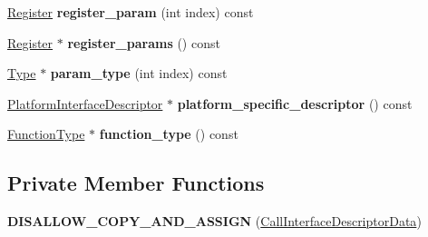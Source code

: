 \begin{DoxyCompactItemize}
\item 
\hyperlink{structv8_1_1internal_1_1_register}{Register} {\bfseries register\+\_\+param} (int index) const \hypertarget{classv8_1_1internal_1_1_call_interface_descriptor_data_af0125d09a09d2b5583cb2a2c18434a3d}{}\label{classv8_1_1internal_1_1_call_interface_descriptor_data_af0125d09a09d2b5583cb2a2c18434a3d}

\item 
\hyperlink{structv8_1_1internal_1_1_register}{Register} $\ast$ {\bfseries register\+\_\+params} () const \hypertarget{classv8_1_1internal_1_1_call_interface_descriptor_data_a4c9db87b655f2961052d17962b5f2a3f}{}\label{classv8_1_1internal_1_1_call_interface_descriptor_data_a4c9db87b655f2961052d17962b5f2a3f}

\item 
\hyperlink{classv8_1_1internal_1_1_type}{Type} $\ast$ {\bfseries param\+\_\+type} (int index) const \hypertarget{classv8_1_1internal_1_1_call_interface_descriptor_data_ab74b7686c103414b12b79923114abf48}{}\label{classv8_1_1internal_1_1_call_interface_descriptor_data_ab74b7686c103414b12b79923114abf48}

\item 
\hyperlink{classv8_1_1internal_1_1_platform_interface_descriptor}{Platform\+Interface\+Descriptor} $\ast$ {\bfseries platform\+\_\+specific\+\_\+descriptor} () const \hypertarget{classv8_1_1internal_1_1_call_interface_descriptor_data_aef81afb49b334d7773dbe9cb2e57fc11}{}\label{classv8_1_1internal_1_1_call_interface_descriptor_data_aef81afb49b334d7773dbe9cb2e57fc11}

\item 
\hyperlink{classv8_1_1internal_1_1_function_type}{Function\+Type} $\ast$ {\bfseries function\+\_\+type} () const \hypertarget{classv8_1_1internal_1_1_call_interface_descriptor_data_a2be577db8bb23381d8f7722382b9f146}{}\label{classv8_1_1internal_1_1_call_interface_descriptor_data_a2be577db8bb23381d8f7722382b9f146}

\end{DoxyCompactItemize}
\subsection*{Private Member Functions}
\begin{DoxyCompactItemize}
\item 
{\bfseries D\+I\+S\+A\+L\+L\+O\+W\+\_\+\+C\+O\+P\+Y\+\_\+\+A\+N\+D\+\_\+\+A\+S\+S\+I\+GN} (\hyperlink{classv8_1_1internal_1_1_call_interface_descriptor_data}{Call\+Interface\+Descriptor\+Data})\hypertarget{classv8_1_1internal_1_1_call_interface_descriptor_data_a556595c8285aea1198549497a7d0737b}{}\label{classv8_1_1internal_1_1_call_interface_descriptor_data_a556595c8285aea1198549497a7d0737b}

\end{DoxyCompactItemize}
